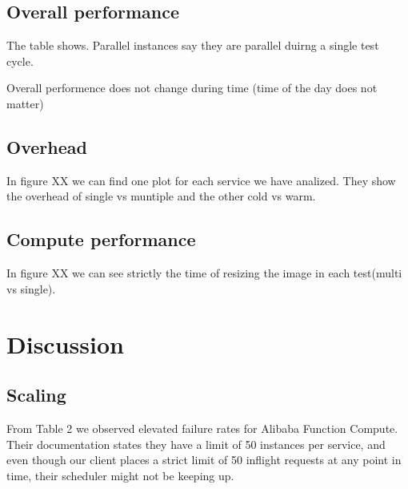 \documentclass[11pt]{article}
\begin{document}
\subsection{Overall performance}

The table shows. Parallel instances say they are parallel duirng a single test cycle.


Overall performence does not change during time (time of the day does not matter)

\subsection{Overhead}

In figure XX we can find one plot for each service we have analized. They show the overhead of single vs muntiple and the other cold vs warm.




\subsection{Compute performance}

In figure XX we can see strictly the time of resizing the image in each test(multi vs single).




\section{Discussion}

\subsection{Scaling}
From Table 2 %
we observed elevated failure rates for Alibaba Function Compute.
Their documentation %
states they have a limit of 50 instances per service,
and even though our client places a strict limit of 50 inflight requests at any point in time,
their scheduler might not be keeping up.
\end{document}
